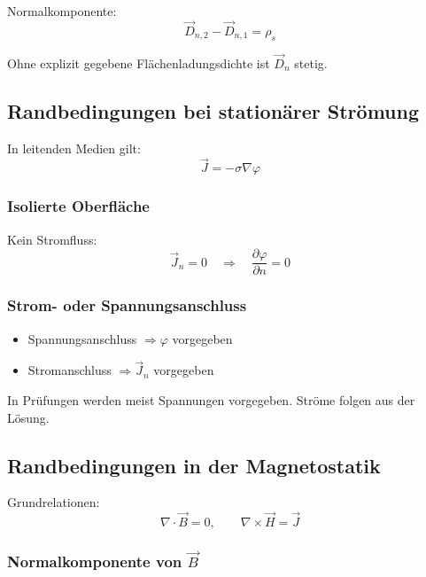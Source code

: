 \documentclass[a4paper]{article}
\newcommand{\D}{\vec D}
\newcommand{\Hf}{\vec H}
\newcommand{\B}{\vec B}
\newcommand{\J}{\vec J}
\begin{document}
Normalkomponente:
\[
\D_{n,2} - \D_{n,1} = \rho_s
\]

\begin{checkitem}
Ohne explizit gegebene Flächenladungsdichte ist $\D_n$ stetig.
\end{checkitem}

\subsection{Randbedingungen bei stationärer Strömung}

In leitenden Medien gilt:
\[
\J = -\sigma \nabla \varphi
\]

\subsubsection{Isolierte Oberfläche}

Kein Stromfluss:
\[
\J_n = 0
\quad \Rightarrow \quad
\frac{\partial \varphi}{\partial n} = 0
\]

\subsubsection{Strom- oder Spannungsanschluss}

\begin{itemize}
  \item Spannungsanschluss $\Rightarrow \varphi$ vorgegeben
  \item Stromanschluss $\Rightarrow \J_n$ vorgegeben
\end{itemize}

\begin{merke}
In Prüfungen werden meist Spannungen vorgegeben.
Ströme folgen aus der Lösung.
\end{merke}

\subsection{Randbedingungen in der Magnetostatik}

Grundrelationen:
\[
\nabla \cdot \B = 0,
\qquad
\nabla \times \Hf = \J
\]

\subsubsection{Normalkomponente von $\B$}
\end{document}

